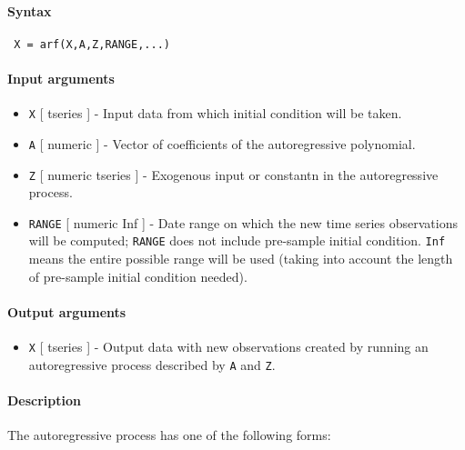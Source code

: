 


	\paragraph{Syntax}
 
 \begin{verbatim}
 X = arf(X,A,Z,RANGE,...)
 \end{verbatim}
 
 \paragraph{Input arguments}
 
 \begin{itemize}
 \item
   \texttt{X} {[} tseries {]} - Input data from which initial condition
   will be taken.
 \item
   \texttt{A} {[} numeric {]} - Vector of coefficients of the
   autoregressive polynomial.
 \item
   \texttt{Z} {[} numeric \textbar{} tseries {]} - Exogenous input or
   constantn in the autoregressive process.
 \item
   \texttt{RANGE} {[} numeric \textbar{} Inf {]} - Date range on which
   the new time series observations will be computed; \texttt{RANGE} does
   not include pre-sample initial condition. \texttt{Inf} means the
   entire possible range will be used (taking into account the length of
   pre-sample initial condition needed).
 \end{itemize}
 
 \paragraph{Output arguments}
 
 \begin{itemize}
 \item
   \texttt{X} {[} tseries {]} - Output data with new observations created
   by running an autoregressive process described by \texttt{A} and
   \texttt{Z}.
 \end{itemize}
 
 \paragraph{Description}
 
 The autoregressive process has one of the following forms:
 
